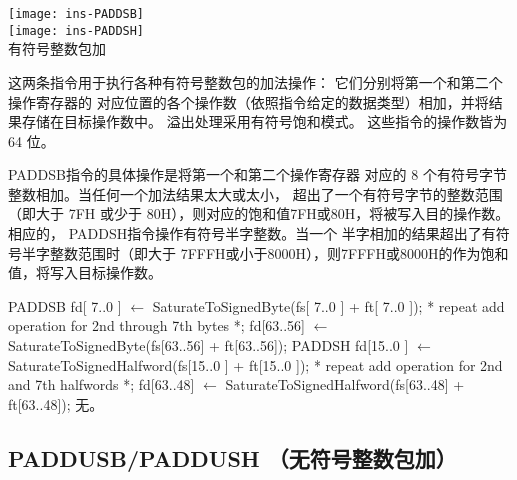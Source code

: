 \begin{instructionblk}
  \texttt{[image: ins-PADDSB]} \\
  \texttt{[image: ins-PADDSH]} \\
  {有符号整数包加}
  {这两条指令用于执行各种有符号整数包的加法操作： 它们分别将第一个和第二个操作寄存器的
  对应位置的各个操作数（依照指令给定的数据类型）相加，并将结果存储在目标操作数中。
  溢出处理采用有符号饱和模式。 这些指令的操作数皆为 64 位。

  PADDSB指令的具体操作是将第一个和第二个操作寄存器
  对应的 8 个有符号字节整数相加。当任何一个加法结果太大或太小，
  超出了一个有符号字节的整数范围（即大于 7FH 或少于
  80H），则对应的饱和值7FH或80H，将被写入目的操作数。
  相应的， PADDSH指令操作有符号半字整数。当一个
  半字相加的结果超出了有符号半字整数范围时（即大于
  7FFFH或小于8000H），则7FFFH或8000H的作为饱和值，将写入目标操作数。}
  {PADDSB \narrownewline
  fd[ 7..0 ]  $\leftarrow$ SaturateToSignedByte(fs[ 7..0 ] + ft[ 7..0 ]); \narrownewline
  * repeat add operation for 2nd through 7th bytes *; \narrownewline
  fd[63..56] $\leftarrow$ SaturateToSignedByte(fs[63..56] + ft[63..56]); \narrownewline \narrownewline
  PADDSH \narrownewline
  fd[15..0 ] $\leftarrow$ SaturateToSignedHalfword(fs[15..0 ] + ft[15..0 ]); \narrownewline
  * repeat add operation for 2nd and 7th halfwords *; \narrownewline
  fd[63..48] $\leftarrow$ SaturateToSignedHalfword(fs[63..48] + ft[63..48]);}
  {无。}
\end{instructionblk}

\subsection{PADDUSB/PADDUSH （无符号整数包加）}

